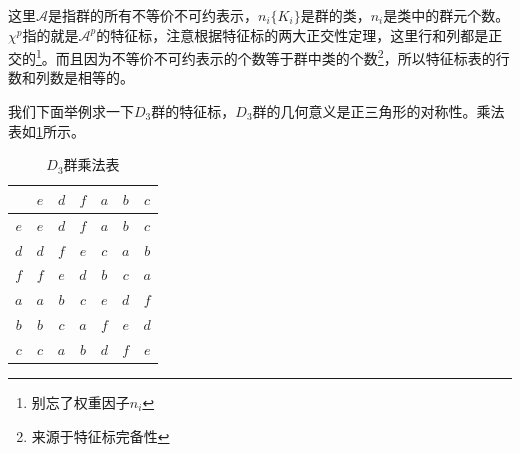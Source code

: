 这里$\mathscr{A}$是指群的所有不等价不可约表示，$n_i\{K_i\}$是群的类，$n_i$是类中的群元个数。$\chi^p$指的就是$\mathscr{A}^p$的特征标，注意根据特征标的两大正交性定理，这里行和列都是正交的\footnote{别忘了权重因子$n_i$}。而且因为不等价不可约表示的个数等于群中类的个数\footnote{来源于特征标完备性}，所以特征标表的行数和列数是相等的。

我们下面举例求一下$D_3$群的特征标，$D_3$群的几何意义是正三角形的对称性。乘法表如\ref{tab:D.3}所示。
\begin{table}[h]
	\centering
	\caption{$D_3$群乘法表}
	\label{tab:D.3}
	\begin{tabular}{c|c|c|c|c|c|c}
		\hline
		 & $e$ &$d$ & $f$&$a$ & $b$&$c$ \\
		\hline $e$& $e$ &$d$ & $f$&$a$ & $b$&$c$ \\
		\hline $d$& $d$ & $f$&$e$ &$c$ &$a$ &$b$ \\
		\hline $f$& $f$ &$e$ &$d$ &$b$ &$c$ &$a$ \\
		\hline $a$& $a$ & $b$& $c$&$e$ &$d$ &$f$ \\
		\hline $b$& $b$ & $c$& $a$&$f$ &$e$ &$d$ \\
		\hline $c$& $c$ & $a$& $b$& $d$& $f$&$e$ \\
		\hline 
	\end{tabular}
\end{table}

